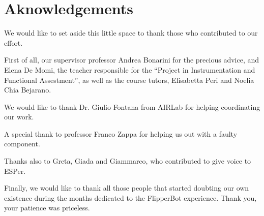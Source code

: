 \documentclass[a4paper,twoside]{book}
\begin{document}
\chapter{Aknowledgements}

We would like to set aside this little space to thank those who contributed to our effort.

First of all, our supervisor professor Andrea Bonarini for the precious advice, and Elena De Momi, the teacher responsible for the \textquotedblleft Project in Instrumentation and Functional Assestment\textquotedblright , as well as the course tutors, Elisabetta Peri and Noelia Chia Bejarano.

We would like to thank Dr. Giulio Fontana from AIRLab for helping coordinating our work.

A special thank to professor Franco Zappa for helping us out with a faulty component.

Thanks also to Greta, Giada and Giammarco, who contributed to give voice to ESPer.

Finally, we would like to thank all those people that started doubting our own existence during the months dedicated to the FlipperBot experience. Thank you, your patience was priceless.
\end{document}

